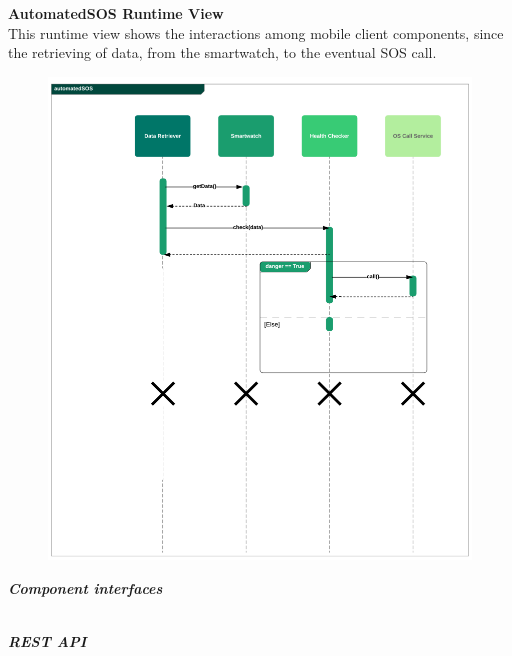 \begin{legal}
\begin{legal}
				\newpage
				\item \textbf{AutomatedSOS Runtime View}\\
				This runtime view shows the interactions among mobile client components, since the retrieving of data, from the smartwatch, to the eventual SOS call.
				\begin{figure}[H]
				\includegraphics[width=\linewidth]{images/seq_diagrams/seq_automatedSOS.png}\\
				\end{figure}
			\end {legal}
		\newpage
		\item \textit{\textbf{Component interfaces}}\\\\
			\begin{legal} 
				\item \textit{\textbf{REST API}}\\\\

\end{legal}
\end{legal}
